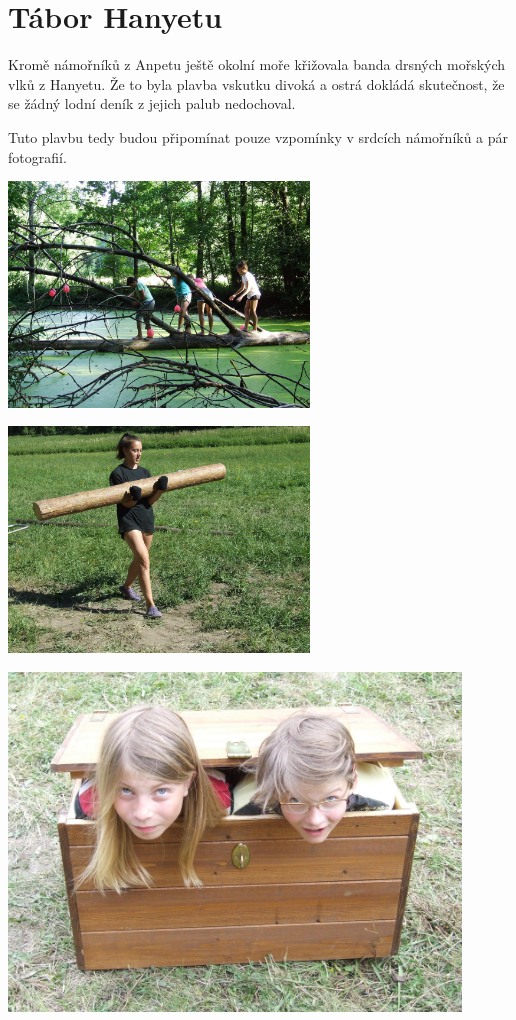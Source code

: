 \chapter{Tábor Hanyetu} %
\label{cha:tábor_hanyetu}

Kromě námořníků z Anpetu ještě okolní moře křižovala banda drsných mořských vlků z Hanyetu. Že to byla plavba vskutku divoká a ostrá dokládá skutečnost, že se žádný lodní deník z jejich palub nedochoval.

Tuto plavbu tedy budou připomínat pouze vzpomínky v srdcích námořníků a pár fotografií.

\begin{center}

\includegraphics[width=8cm]{img/hanyetu_tabor/strom.JPG}
\vspace*{10pt}


\includegraphics[width=8cm]{img/hanyetu_tabor/klada.JPG}
\clearpage


\includegraphics[width=12cm]{img/hanyetu_tabor/vbedne.JPG}
\vspace*{10pt}


\end{center}
